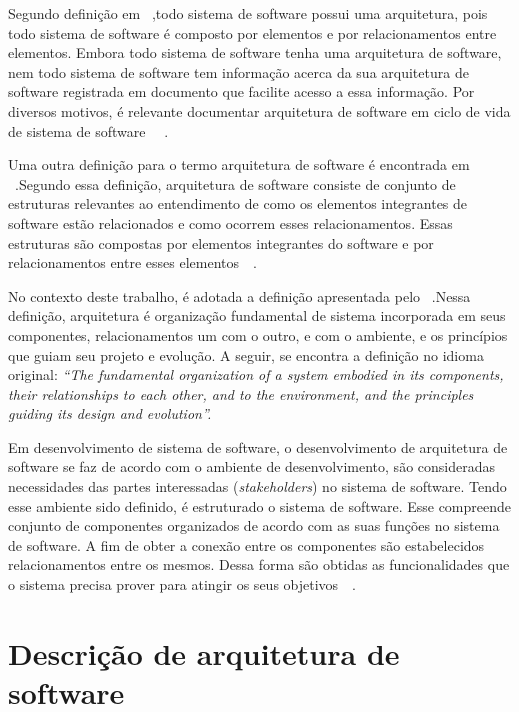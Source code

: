 Segundo definição em ~\cite{arq_01},todo sistema de software possui uma arquitetura, pois todo sistema de software é composto por elementos e por relacionamentos entre elementos. Embora todo sistema de software tenha uma arquitetura de software, nem todo sistema de software tem informação acerca da sua arquitetura de software registrada em documento que facilite acesso a essa informação. Por diversos motivos, é relevante documentar arquitetura de software em ciclo de vida de sistema de software ~\cite{arq_01}~\cite{Carnegie_textbook}.

Uma outra definição para o termo arquitetura de software é encontrada em ~\cite{arq_02}.Segundo essa definição, arquitetura de software consiste de conjunto de estruturas relevantes ao entendimento de como os elementos integrantes de software estão relacionados e como ocorrem esses relacionamentos. Essas estruturas são compostas por elementos integrantes do software e por relacionamentos entre esses elementos~\cite{Carnegie_textbook}~\cite{arq_02}.

No contexto deste trabalho, é adotada a definição apresentada pelo ~\cite{ISO_1471}.Nessa definição, arquitetura é organização fundamental de sistema incorporada em seus componentes, relacionamentos um com o outro, e com o ambiente, e os princípios que guiam seu projeto e evolução. A seguir, se encontra a definição no idioma original: \emph{“The fundamental organization of a system embodied in its components, their relationships to each other, and to the environment, and the principles guiding its design and evolution”.}~\cite{Carnegie_textbook}~\cite{ISO_1471}

Em desenvolvimento de sistema de software, o desenvolvimento de arquitetura de software se faz de acordo com o ambiente de desenvolvimento, são consideradas necessidades das partes interessadas (\emph{stakeholders}) no sistema de software. Tendo esse ambiente sido definido, é estruturado o sistema de software. Esse compreende conjunto de componentes organizados de acordo com as suas funções no sistema de software. A fim de obter a conexão entre os componentes são estabelecidos relacionamentos entre os mesmos. Dessa forma são obtidas as funcionalidades que o sistema precisa prover para atingir os seus objetivos~\cite{Carnegie_textbook}~\cite{ISO_1471}. 


\section{Descrição de arquitetura de software}

